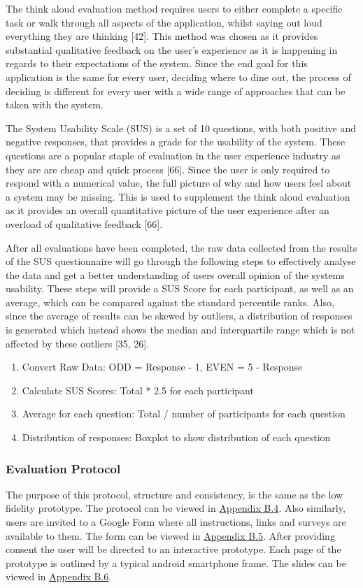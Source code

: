 \documentclass[a4 paper, 12pt]{article}
\begin{document}
    The think aloud evaluation method requires users to either complete a specific task or walk through all aspects of the application, whilst saying out loud everything they are thinking [42]. This method was chosen as it provides substantial qualitative feedback on the user's experience as it is happening in regards to their expectations of the system. Since the end goal for this application is the same for every user, deciding where to dine out, the process of deciding is different for every user with a wide range of approaches that can be taken with the system.

    The System Usability Scale (SUS) is a set of 10 questions, with both positive and negative responses, that provides a grade for the usability of the system. These questions are a popular staple of evaluation in the user experience industry as they are are cheap and quick process [66]. Since the user is only required to respond with a numerical value, the full picture of why and how users feel about a system may be missing. This is used to supplement the think aloud evaluation as it provides an overall quantitative picture of the user experience after an overload of qualitative feedback [66].
    
    After all evaluations have been completed, the raw data collected from the results of the SUS questionnaire will go through the following steps to effectively analyse the data and get a better understanding of users overall opinion of the systems usability. These steps will provide a SUS Score for each participant, as well as an average, which can be compared against the standard percentile ranks. Also, since the average of results can be skewed by outliers, a distribution of responses is generated which instead shows the median and interquartile range which is not affected by these outliers [35, 26].
        \begin{enumerate}
            \item Convert Raw Data: ODD = Response - 1, EVEN = 5 - Response
            \item Calculate SUS Scores: Total * 2.5 for each participant
            \item  Average for each question: Total / number of participants for each question
            \item Distribution of responses: Boxplot to show distribution of each question
        \end{enumerate}  

    \subsubsection{Evaluation Protocol}
    The purpose of this protocol, structure and consistency, is the same as the low fidelity prototype. The protocol can be viewed in \hyperref[sec:B.4]{Appendix B.4}. Also similarly, users are invited to a Google Form where all instructions, links and surveys are available to them. The form can be viewed in \hyperref[sec:B.5]{Appendix B.5}. After providing consent the user will be directed to an interactive prototype. Each page of the prototype is outlined by a typical android smartphone frame. The slides can be viewed in \hyperref[sec:B.1]{Appendix B.6}. 
\end{document}

